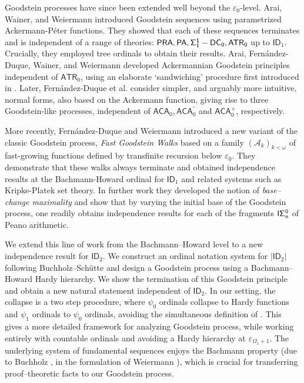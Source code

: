 \documentclass{amsart}
\theoremstyle{plain}
\theoremstyle{plain}
\newcommand{\ID}{\mathsf{ID}}
\newcommand{\PA}{\mathsf{PA}}
\newcommand{\PRA}{\mathsf{PRA}}
\newcommand{\ATR}{\mathsf{ATR}}
\newcommand{\ACA}{\mathsf{ACA}}
\begin{document}
Goodstein processes have since been extended well beyond the $\varepsilon_0$‑level.
Arai, Wainer, and Weiermann \cite{AraiWainerWeiermann} introduced  Goodstein sequences using parametrized Ackermann-P\'eter functions. They showed that each of these sequences terminates and is independent of a range of theories: $\PRA, \PA, \sf \Sigma_1^1-DC_0, \ATR_0$ up to  $\ID_1$. Crucially, they employed tree ordinals to obtain their results. Arai, Fern\'andez-Duque, Wainer, and Weiermann \cite{Arai.etal2020} developed  Ackermannian Goodstein principles independent of $\ATR_0$, using an elaborate ‘sandwiching’ procedure first introduced
in \cite{Weiermann2017}. Later, Fern\'andez-Duque et al. \cite{Fernandez-Duque.etal2023} consider simpler, and arguably more intuitive, normal forms, also based on the Ackermann function, giving rise to  three Goodstein-like processes, independent of $\ACA_0, \ACA_0^{'}$ and $\ACA_0^+$, respectively.

More recently, Fern\'andez‑Duque and Weiermann introduced a new variant of the classic Goodstein process, {\em Fast Goodstein Walks} \cite{FernandezDuqueWeiermann2022} based on a family $(\mathcal{A}_k)_{k<\omega}$ of  fast-growing functions defined by transfinite recursion below $\varepsilon_0$. They demonstrate that these walks always terminate and obtained independence results at the Bachmann-Howard ordinal for $\ID_1$ and related systems such as Kripke-Platek set theory.
In further work \cite{FernandezDuqueWeiermann2024WalkGoodstein} they developed the notion of {\em base–change maximality} and show that by varying the initial base of the Goodstein process, one readily obtains independence results for each of the fragments $\sf I\Sigma^0_n$ of Peano arithmetic.
\smallskip

We extend this line of work from the Bachmann–Howard level to a new independence result for $\ID_2$.
We construct an ordinal notation system for $|\ID_2|$
following Buchholz–Sch\"utte\cite{BuchholzSchutte} and design a Goodstein process using a Bachmann–Howard Hardy hierarchy.
We show the termination of this Goodstein principle and obtain a new natural statement independent of $\ID_2$.
In our setting, the collapse is a two step procedure, 
where $\psi_0$ ordinals collapse to Hardy functions and $\psi_1$ ordinals to $\psi_0$ ordinals, avoiding the simultaneous definition of \cite{BuchholzSchutte}. 
This gives a more detailed framework for analyzing Goodstein process, while working entirely with countable ordinals and avoiding a Hardy hierarchy at $\varepsilon_{\Omega_1+1}$. The underlying system of fundamental sequences enjoys the Bachmann property (due to Buchholz \cite{Buchholz2017SurveyOrdinalNotations}, in the formulation of Weiermann \cite{Weiermann95}), which is crucial for transferring proof–theoretic facts to our Goodstein process.\smallskip
\end{document}
